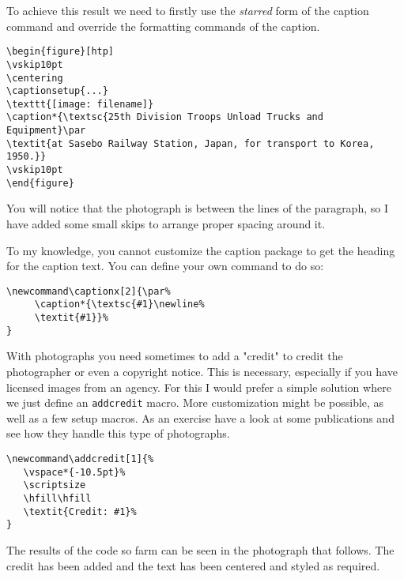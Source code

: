 To achieve this result we need to firstly use the \emph{starred} form of the caption command and override the formatting commands of the caption.
\begin{verbatim}
\begin{figure}[htp]
\vskip10pt
\centering
\captionsetup{...}
\texttt{[image: filename]}
\caption*{\textsc{25th Division Troops Unload Trucks and Equipment}\par
\textit{at Sasebo Railway Station, Japan, for transport to Korea, 1950.}}
\vskip10pt
\end{figure}
\end{verbatim}
You will notice that the photograph is between the lines of the paragraph, so I have added some small skips to arrange proper spacing around it.


To my knowledge, you cannot customize the caption package to get the heading for the caption text. You can define your own command to do so:
\begin{verbatim}
\newcommand\captionx[2]{\par%
     \caption*{\textsc{#1}\newline%
     \textit{#1}}%
}
\end{verbatim}
\newcommand\captionx[2]{\par%
     \caption*{\textsc{#1}\par%
     \textit{#2}}%
}

With photographs you need sometimes to add a "credit" to credit the photographer or even a copyright notice. This is necessary, especially if you have licensed images from an agency. For this I would prefer a simple solution where we
just define an \verb+addcredit+ macro. More customization might be possible, as well as a few setup macros. As an exercise have a look at some publications and see how they handle this type of photographs.

\begin{verbatim}
\newcommand\addcredit[1]{%
   \vspace*{-10.5pt}%
   \scriptsize
   \hfill\hfill
   \textit{Credit: #1}%
}
\end{verbatim}
\providecommand\addcredit[1]{%
 \scriptsize%
 \vspace*{-10.5pt}%
 \hfill\hfill\textit{Credit: #1}%
 \vspace{10pt}
}

The results of the code so farm can be seen in the photograph that follows. The credit has been added and
the text has been centered and styled as required.

